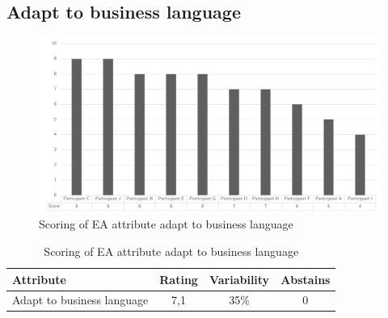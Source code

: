 \subsection{Adapt to business language}
\begin{figure}[H]
	\centering
	\includegraphics[width=0.9\linewidth]{images/scoreeaadapttobusinesslanguage}
	\caption[Scoring of EA attribute adapt to business language]{Scoring of EA attribute adapt to business language}
	\label{fig:appscoringeaadapttobusinesslanguage}
\end{figure}
\begin{table}[H]
	\centering
	\begin{tabular}{p{}ccc}
		\toprule
		\textbf{Attribute} & \textbf{Rating} & \textbf{Variability} & \textbf{Abstains} \\
		\midrule
		Adapt to business language & 7,1 & 35\% & 0 \\%
		\bottomrule
	\end{tabular}%
	\caption[Scoring of EA attribute adapt to business language]{Scoring of EA attribute adapt to business language}
	\label{tab:appscoringeaadapttobusinesslanguage}%
\end{table}%
\newpage
